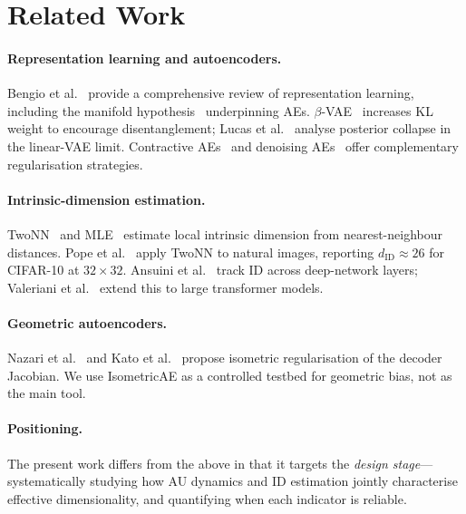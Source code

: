 \documentclass[11pt,a4paper]{article}
\begin{document}
\section{Related Work}\label{sec:related}

\paragraph{Representation learning and autoencoders.}
Bengio et al.~\cite{bengio2013representation} provide a comprehensive review of
representation learning, including the manifold hypothesis~\cite{fefferman2016manifold}
underpinning AEs.  $\beta$-VAE~\cite{higgins2017betavae} increases KL weight to
encourage disentanglement; Lucas et al.~\cite{lucas2019elbo} analyse posterior
collapse in the linear-VAE limit.  Contractive AEs~\cite{rifai2011cae} and
denoising AEs~\cite{alain2014dae} offer complementary regularisation strategies.

\paragraph{Intrinsic-dimension estimation.}
TwoNN~\cite{facco2017twonn} and MLE~\cite{levina2005mle} estimate local
intrinsic dimension from nearest-neighbour distances.  Pope et
al.~\cite{pope2021intrinsic} apply TwoNN to natural images, reporting
$d_{\mathrm{ID}}\approx26$ for CIFAR-10 at $32\!\times\!32$.  Ansuini et
al.~\cite{ansuini2019intrinsic} track ID across deep-network layers; Valeriani
et al.~\cite{valeriani2023geometry} extend this to large transformer models.

\paragraph{Geometric autoencoders.}
Nazari et al.~\cite{nazari2023geometric} and Kato et
al.~\cite{kato2020rdae} propose isometric regularisation of the decoder Jacobian.
We use IsometricAE as a controlled testbed for geometric bias, not as the main tool.

\paragraph{Positioning.}
The present work differs from the above in that it targets the \emph{design
stage}—systematically studying how AU dynamics and ID estimation jointly
characterise effective dimensionality, and quantifying when each indicator is
reliable.

\end{document}
